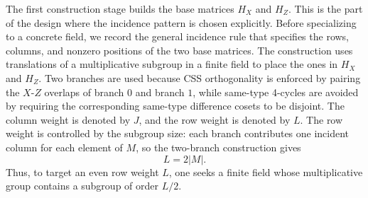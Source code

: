 \documentclass[11pt,a4paper]{article}
\newcommand{\HX}{H_X}
\newcommand{\HZ}{H_Z}
\theoremstyle{uprighttheorem}
\begin{document}
The first construction stage builds the base matrices $\HX$ and $\HZ$.
This is the part of the design where the incidence pattern is chosen explicitly.
Before specializing to a concrete field, we record the general incidence rule that specifies the rows, columns, and nonzero positions of the two base matrices.
The construction uses translations of a multiplicative subgroup in a finite field to place the ones in $\HX$ and $\HZ$.
Two branches are used because CSS orthogonality is enforced by pairing the $X$-$Z$ overlaps of branch \(0\) and branch \(1\), while same-type 4-cycles are avoided by requiring the corresponding same-type difference cosets to be disjoint.
The column weight is denoted by $J$, and the row weight is denoted by $L$.
The row weight is controlled by the subgroup size: each branch contributes one incident column for each element of $M$, so the two-branch construction gives
\[
  L=2|M|.
\]
Thus, to target an even row weight $L$, one seeks a finite field whose multiplicative group contains a subgroup of order $L/2$.
\end{document}

